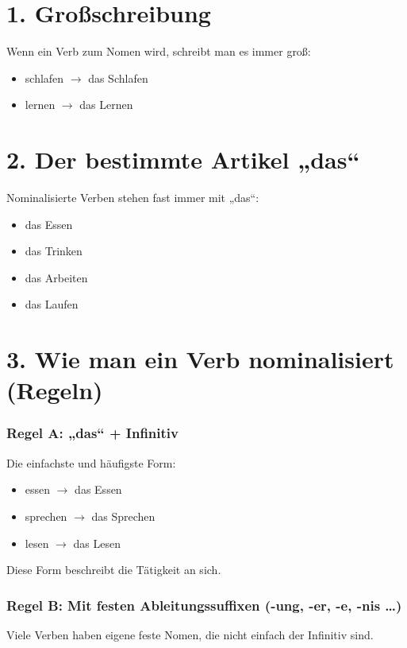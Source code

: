 \section{1. Großschreibung}
    Wenn ein Verb zum Nomen wird, schreibt man es immer groß:
    \begin{itemize}
        \item schlafen $\rightarrow$ das Schlafen
        \item lernen $\rightarrow$ das Lernen
    \end{itemize}

\section{2. Der bestimmte Artikel „das“}
    Nominalisierte Verben stehen fast immer mit „das“:
    \begin{itemize}
        \item das Essen
        \item das Trinken
        \item das Arbeiten
        \item das Laufen
    \end{itemize}

\section{3. Wie man ein Verb nominalisiert (Regeln)}
    
    \subsubsection*{Regel A: „das“ + Infinitiv}
        Die einfachste und häufigste Form:
        \begin{itemize}
            \item essen $\rightarrow$ das Essen
            \item sprechen $\rightarrow$ das Sprechen
            \item lesen $\rightarrow$ das Lesen
        \end{itemize}
        Diese Form beschreibt die Tätigkeit an sich.
    
    \subsubsection*{Regel B: Mit festen Ableitungssuffixen (-ung, -er, -e, -nis \dots)}
        
        Viele Verben haben eigene feste Nomen, die nicht einfach der Infinitiv sind.
        
